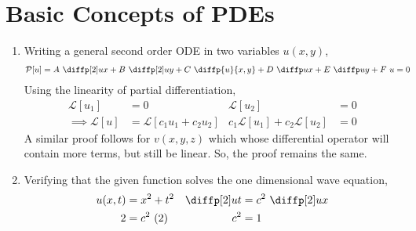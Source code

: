 \section{Basic Concepts of PDEs}

\begin{enumerate}
    \item Writing a general second order ODE in two variables $ u(x, y) $,
          \begin{align}
              \mathcal{P}[u] & = A\ \diffp[2] ux + B\ \diffp[2] uy + C\ \diffp {u}{x,y}
              + D\ \diffp ux + E\ \diffp uy + F\ u = 0
          \end{align}
          Using the linearity of partial differentiation,
          \begin{align}
              \mathcal{L}[u_1]        & = 0                            &
              \mathcal{L}[u_2]        & = 0                              \\
              \implies \mathcal{L}[u] & = \mathcal{L}[c_1u_1 + c_2u_2] &
              c_1 \mathcal{L}[u_1]
              + c_2 \mathcal{L}[u_2]  & = 0
          \end{align}
          A similar proof follows for $ v(x, y, z) $ which whose differential operator
          will contain more terms, but still be linear. So, the proof remains the same.

    \item Verifying that the given function solves the one dimensional wave equation,
          \begin{align}
              u(x,t)       & = x^2 + t^2         &
              \diffp[2] ut & = c^2\ \diffp[2] ux   \\
              2            & = c^2\ (2)          &
              c^2          & = 1
          \end{align}
          \begin{figure}[H]
              \centering
          \end{figure}


\end{enumerate}
